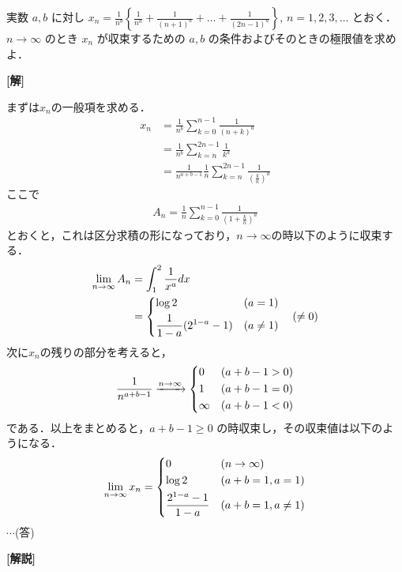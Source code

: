\documentclass[a4paper,10pt]{ltjsarticle}
\begin{document}
\begin{oframed}
実数 $a, b$ に対し $\displaystyle x_n = \frac{1}{n^b} \left\{ \frac{1}{n^a} + \frac{1}{(n+1)^a} + \dots + \frac{1}{(2n-1)^a} \right\}$, $n=1,2,3,\dots$ とおく．$n \to \infty$ のとき $x_n$ が収束するための $a, b$ の条件およびそのときの極限値を求めよ．
\end{oframed}
\setlength{\columnseprule}{0.4pt}
\begin{multicols}{2}
{\bf[解]}

まずは$x_n$の一般項を求める．
\begin{align*}
x_n 
&= \frac{1}{n^{b}} \sum_{k=0}^{n-1} \frac{1}{(n+k)^a} \\
&= \frac{1}{n^{b}} \sum_{k=n}^{2n-1} \frac{1}{k^a} \\
&= \frac{1}{n^{a+b-1}} \frac{1}{n}\sum_{k=n}^{2n-1} \frac{1}{\left(\frac{k}{n}\right)^a} 
\end{align*}
ここで
\begin{align*}
    A_n = \frac{1}{n}\sum_{k=0}^{n-1} \frac{1}{\left(1+\frac{k}{n}\right)^a}
\end{align*}
とおくと，これは区分求積の形になっており，$n\to\infty$の時以下のように収束する．
\begin{align*}
 \lim_{n\to\infty} A_n 
 &= \int_1^2 \frac{1}{x^a} dx \\
 &= 
  \begin{dcases} 
    \log 2 & (a=1) \\ 
    \frac{1}{1-a}(2^{1-a}-1) & (a \ne 1) 
  \end{dcases} \quad (\ne 0)
\end{align*}
次に$x_n$の残りの部分を考えると，
\begin{align*}
    \frac{1}{n^{a+b-1}} \xrightarrow{n \to \infty} 
    \begin{dcases} 
        0 & (a+b-1 > 0) \\ 
        1 & (a+b-1 = 0) \\ 
        \infty & (a+b-1 < 0) 
    \end{dcases} 
\end{align*}
である．以上をまとめると，$a+b-1 \ge 0$ の時収束し，その収束値は以下のようになる．
\begin{align*}
 \lim_{n\to\infty} x_n = 
 \begin{dcases}
    0  & (n \to \infty) \\
    \log 2 & (a+b=1, a=1) \\
    \frac{2^{1-a}-1}{1-a} & (a+b=1, a \ne 1)
 \end{dcases}
\end{align*}
$\cdots$(答)

{\bf[解説]}

     \newpage
\end{multicols}
\end{document}
